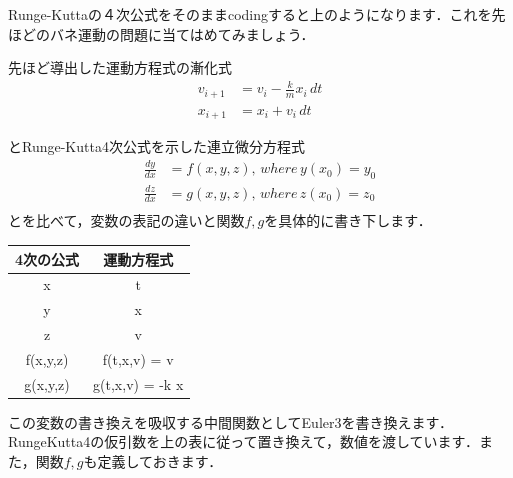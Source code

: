 \documentclass[11pt]{article}
\begin{document}
    Runge-Kuttaの４次公式をそのままcodingすると上のようになります．これを先ほどのバネ運動の問題に当てはめてみましょう．

先ほど導出した運動方程式の漸化式 \[
\begin{aligned}
v_{i+1} & = v_i - \frac{k}{m} x_i\, dt \\
x_{i+1} & = x_i + v_i\, dt
\end{aligned}
\]

とRunge-Kutta4次公式を示した連立微分方程式 \[
\begin{aligned}
\frac{dy}{dx} &= f(x,y,z), \, where \, y(x_0)=y_0 \\
\frac{dz}{dx} &= g(x,y,z), \, where \, z(x_0)=z_0 \\
\end{aligned}
\] とを比べて，変数の表記の違いと関数\(f,g\)を具体的に書き下します．

\begin{longtable}[]{@{}cc@{}}
\toprule
4次の公式 & 運動方程式\tabularnewline
\midrule
\endhead
x & t\tabularnewline
y & x\tabularnewline
z & v\tabularnewline
f(x,y,z) & f(t,x,v) = v\tabularnewline
g(x,y,z) & g(t,x,v) = -k x\tabularnewline
\bottomrule
\end{longtable}

この変数の書き換えを吸収する中間関数としてEuler3を書き換えます．RungeKutta4の仮引数を上の表に従って置き換えて，数値を渡しています．また，関数\(f,g\)も定義しておきます．
\end{document}
